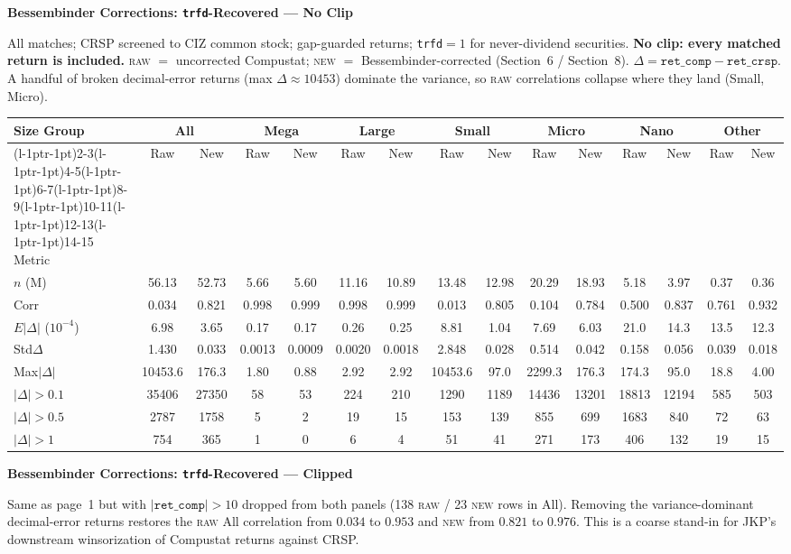 \documentclass[11pt]{article}
\makeatletter
\newcommand{\bigtable}[8]{%
\begin{table}[h]
\centering
\setlength{\tabcolsep}{3pt}
\renewcommand{\arraystretch}{1.5}
\small
\begin{tabular*}{\textwidth}{l
 @{\extracolsep{\fill}} c @{\extracolsep{0pt}\hspace{10pt}} c
 @{\extracolsep{\fill}} c @{\extracolsep{0pt}\hspace{10pt}} c
 @{\extracolsep{\fill}} c @{\extracolsep{0pt}\hspace{10pt}} c
 @{\extracolsep{\fill}} c @{\extracolsep{0pt}\hspace{10pt}} c
 @{\extracolsep{\fill}} c @{\extracolsep{0pt}\hspace{10pt}} c
 @{\extracolsep{\fill}} c @{\extracolsep{0pt}\hspace{10pt}} c
 @{\extracolsep{\fill}} c @{\extracolsep{0pt}\hspace{10pt}} c}
\toprule
Size Group & \multicolumn{2}{c}{All} & \multicolumn{2}{c}{Mega} & \multicolumn{2}{c}{Large}
& \multicolumn{2}{c}{Small} & \multicolumn{2}{c}{Micro} & \multicolumn{2}{c}{Nano}
& \multicolumn{2}{c}{Other} \\
\cmidrule(l{-1pt}r{-1pt}){2-3}\cmidrule(l{-1pt}r{-1pt}){4-5}\cmidrule(l{-1pt}r{-1pt}){6-7}\cmidrule(l{-1pt}r{-1pt}){8-9}\cmidrule(l{-1pt}r{-1pt}){10-11}\cmidrule(l{-1pt}r{-1pt}){12-13}\cmidrule(l{-1pt}r{-1pt}){14-15}
Metric & \multicolumn{1}{c}{Raw} & \multicolumn{1}{c}{New} & \multicolumn{1}{c}{Raw} & \multicolumn{1}{c}{New} & \multicolumn{1}{c}{Raw} & \multicolumn{1}{c}{New} & \multicolumn{1}{c}{Raw} & \multicolumn{1}{c}{New} & \multicolumn{1}{c}{Raw} & \multicolumn{1}{c}{New} & \multicolumn{1}{c}{Raw} & \multicolumn{1}{c}{New} & \multicolumn{1}{c}{Raw} & \multicolumn{1}{c}{New} \\
\midrule
#1 \\
#2 \\
#3 \\
#4 \\
#5 \\
#6 \\
#7 \\
#8 \\
\bottomrule
\end{tabular*}
\end{table}}
\makeatother
\begin{document}
\begin{center}\Large\textbf{Bessembinder Corrections: \texttt{trfd}-Recovered --- No Clip}\end{center}

\noindent
All matches; CRSP screened to CIZ common stock; gap-guarded returns;
\texttt{trfd}$=1$ for never-dividend securities. \textbf{No clip: every matched
return is included.} \textsc{raw} $=$ uncorrected Compustat; \textsc{new} $=$
Bessembinder-corrected (Section~6 / Section~8).
$\Delta = \texttt{ret\_comp}-\texttt{ret\_crsp}$. A handful of broken
decimal-error returns (max $\Delta \approx 10453$) dominate the variance, so
\textsc{raw} correlations collapse where they land (Small, Micro).

\vfill

\bigtable
{$n$ (M)        & 56.13 & 52.73 & 5.66 & 5.60 & 11.16 & 10.89 & 13.48 & 12.98 & 20.29 & 18.93 & 5.18 & 3.97 & 0.37 & 0.36}
{Corr          & 0.034 & 0.821 & 0.998 & 0.999 & 0.998 & 0.999 & 0.013 & 0.805 & 0.104 & 0.784 & 0.500 & 0.837 & 0.761 & 0.932}
{$E|\Delta|$ ($10^{-4}$) & 6.98 & 3.65 & 0.17 & 0.17 & 0.26 & 0.25 & 8.81 & 1.04 & 7.69 & 6.03 & 21.0 & 14.3 & 13.5 & 12.3}
{Std$\Delta$   & 1.430 & 0.033 & 0.0013 & 0.0009 & 0.0020 & 0.0018 & 2.848 & 0.028 & 0.514 & 0.042 & 0.158 & 0.056 & 0.039 & 0.018}
{Max$|\Delta|$ & 10453.6 & 176.3 & 1.80 & 0.88 & 2.92 & 2.92 & 10453.6 & 97.0 & 2299.3 & 176.3 & 174.3 & 95.0 & 18.8 & 4.00}
{$|\Delta|{>}0.1$ & 35406 & 27350 & 58 & 53 & 224 & 210 & 1290 & 1189 & 14436 & 13201 & 18813 & 12194 & 585 & 503}
{$|\Delta|{>}0.5$ & 2787 & 1758 & 5 & 2 & 19 & 15 & 153 & 139 & 855 & 699 & 1683 & 840 & 72 & 63}
{$|\Delta|{>}1$ & 754 & 365 & 1 & 0 & 6 & 4 & 51 & 41 & 271 & 173 & 406 & 132 & 19 & 15}

\vfill

\newpage

\begin{center}\Large\textbf{Bessembinder Corrections: \texttt{trfd}-Recovered --- Clipped}\end{center}

\noindent
Same as page~1 but with $|\texttt{ret\_comp}|>10$ dropped from both panels
(138 \textsc{raw} / 23 \textsc{new} rows in All). Removing the variance-dominant
decimal-error returns restores the \textsc{raw} All correlation from $0.034$ to
$0.953$ and \textsc{new} from $0.821$ to $0.976$. This is a coarse stand-in for
JKP's downstream winsorization of Compustat returns against CRSP.
\end{document}
